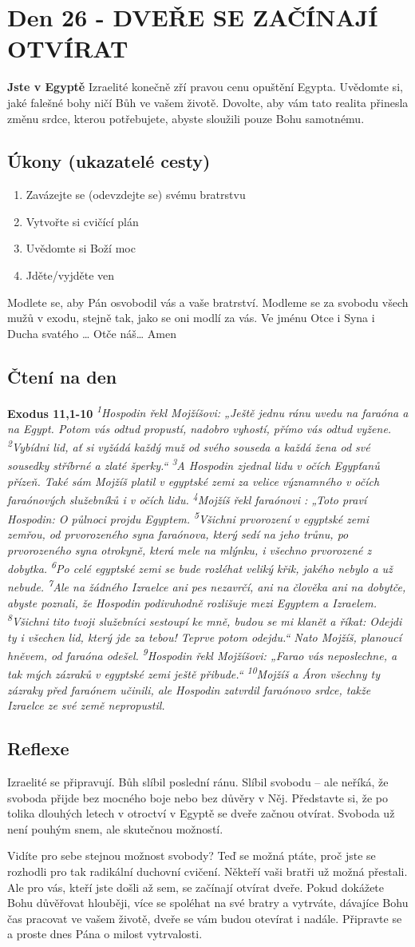 \documentclass[11pt]{article}
\newcommand{\zacatekCtvrtyTyden}{
  \textbf{Jste v Egyptě} \newline
  Izraelité konečně zří pravou cenu opuštění Egypta. Uvědomte si, jaké falešné bohy ničí Bůh ve vašem životě.
Dovolte, aby vám tato realita přinesla změnu srdce, kterou potřebujete, abyste sloužili pouze Bohu samotnému.

\subsection*{Úkony (ukazatelé cesty)}
\begin{enumerate}
  \item Zavázejte se (odevzdejte se) svému bratrstvu
  \item Vytvořte si cvičící plán
  \item Uvědomte si Boží moc
  \item Jděte/vyjděte ven
\end{enumerate}
Modlete se, aby Pán osvobodil vás a vaše bratrství. \newline
Modleme se za svobodu všech mužů v exodu, stejně tak, jako se oni modlí za vás.\newline
Ve jménu Otce i Syna i Ducha svatého …  Otče náš… Amen
}
\begin{document}
\newpage
\section{Den 26 - DVEŘE SE ZAČÍNAJÍ OTVÍRAT}
\zacatekCtvrtyTyden
\subsection*{Čtení na den}
\textbf{Exodus 11,1-10}
\newline
\textit{
\textsuperscript{1}Hospodin řekl Mojžíšovi: „Ještě jednu ránu uvedu na faraóna a na Egypt. Potom vás odtud propustí, nadobro vyhostí, přímo vás odtud vyžene.
\textsuperscript{2}Vybídni lid, ať si vyžádá každý muž od svého souseda a každá žena od své sousedky stříbrné a zlaté šperky.“
\textsuperscript{3}A Hospodin zjednal lidu v očích Egypťanů přízeň. Také sám Mojžíš platil v egyptské zemi za velice významného v očích faraónových služebníků i v očích lidu.
\textsuperscript{4}Mojžíš řekl faraónovi : „Toto praví Hospodin: O půlnoci projdu Egyptem.
\textsuperscript{5}Všichni prvorození v egyptské zemi zemřou, od prvorozeného syna faraónova, který sedí na jeho trůnu, po prvorozeného syna otrokyně, která mele na mlýnku, i všechno prvorozené z dobytka.
\textsuperscript{6}Po celé egyptské zemi se bude rozléhat veliký křik, jakého nebylo a už nebude.
\textsuperscript{7}Ale na žádného Izraelce ani pes nezavrčí, ani na člověka ani na dobytče, abyste poznali, že Hospodin podivuhodně rozlišuje mezi Egyptem a Izraelem.
\textsuperscript{8}Všichni tito tvoji služebníci sestoupí ke mně, budou se mi klanět a říkat: Odejdi ty i všechen lid, který jde za tebou! Teprve potom odejdu.“ Nato Mojžíš, planoucí hněvem, od faraóna odešel.
\textsuperscript{9}Hospodin řekl Mojžíšovi: „Farao vás neposlechne, a tak mých zázraků v egyptské zemi ještě přibude.“
\textsuperscript{10}Mojžíš a Áron všechny ty zázraky před faraónem učinili, ale Hospodin zatvrdil faraónovo srdce, takže Izraelce ze své země nepropustil.  
}

\subsection*{Reflexe}
Izraelité se připravují. Bůh slíbil poslední ránu. Slíbil svobodu – ale neříká, že svoboda přijde bez
mocného boje nebo bez důvěry v Něj. Představte si, že po tolika dlouhých letech v otroctví v Egyptě se
dveře začnou otvírat. Svoboda už není pouhým snem, ale skutečnou možností.

Vidíte pro sebe stejnou možnost svobody? Teď se možná ptáte, proč jste se rozhodli pro tak radikální
duchovní cvičení. Někteří vaši bratři už možná přestali. Ale pro vás, kteří jste došli až sem, se začínají
otvírat dveře. Pokud dokážete Bohu důvěřovat hlouběji, více se spoléhat na své bratry a vytrváte, dávajíce
Bohu čas pracovat ve vašem životě, dveře se vám budou otevírat i nadále. Připravte se a proste dnes Pána
o milost vytrvalosti.
\end{document}
